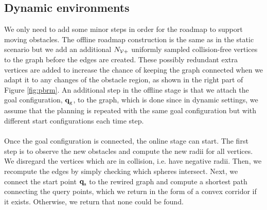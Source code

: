 \documentclass[../main.tex]{subfiles}
\begin{document}
\subsection{Dynamic environments}
\label{sec:pbrm:dyn}
We only need to add some minor steps in order for the roadmap to support moving obstacles. The offline roadmap construction is the same as in the static scenario but we add an additional $N_{\mathcal{V}+}$ uniformly sampled collision-free vertices to the graph before the edges are created. These possibly redundant extra vertices are added to increase the chance of keeping the graph connected when we adapt it to any changes of the obstacle region, as shown in the right part of Figure \ref{fig:pbrm}. An additional step in the offline stage is that we attach the goal configuration, $\textbf{q}_{\text{g}}$, to the graph, which is done since in dynamic settings, we assume that the planning is repeated with the same goal configuration but with different start configurations each time step.
\\\\
Once the goal configuration is connected, the online stage can start. The first step is to observe the new obstacles and compute the new radii for all vertices. We disregard the vertices which are in collision, i.e. have negative radii. Then, we recompute the edges by simply checking which spheres intersect. Next, we connect the start point $\textbf{q}_{\text{s}}$ to the rewired graph and compute a shortest path connecting the query points, which we  return in the form of a convex corridor if it exists. Otherwise, we return that none could be found.
\end{document}
